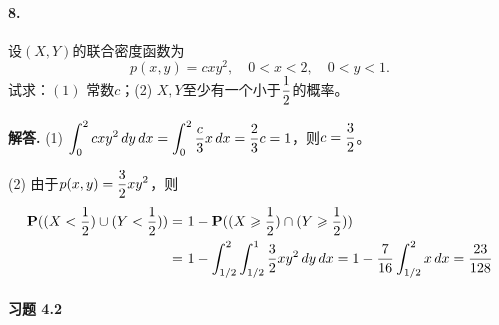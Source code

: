\documentclass[12pt, a4paper, oneside]{ctexart}
\newenvironment{solution}{\par\noindent\textbf{解答. }}{\bigskip\par}
\begin{document}
\paragraph{8.}设$(X,Y)$的联合密度函数为
\begin{equation*}
    p(x, y) = cxy^2,\quad 0 < x <  2,\quad 0 < y < 1.
\end{equation*}
试求：$(1)$ 常数$c$；(2) $X, Y$至少有一个小于$\displaystyle\frac{1}{2}$的概率。
\begin{solution}
    (1) $\displaystyle \int_0^2cxy^2\,dy\,dx = \int_0^2\frac{c}{3}x\,dx = \frac{2}{3}c = 1$，则$\displaystyle c = \frac{3}{2}$。

    (2) 由于$\displaystyle p(x, y) = \frac{3}{2}xy^2$，则
    \begin{equation*}
        \begin{aligned}
            \P((X < \frac{1}{2})\cup (Y < \frac{1}{2})) =&\ 1-\P((X\geqslant \frac{1}{2})\cap(Y\geqslant \frac{1}{2}))\\
             =&\ 1-\int_{1/2}^2\int_{1/2}^1\frac{3}{2}xy^2\,dy\,dx = 1-\frac{7}{16}\int_{1/2}^2x\,dx = \frac{23}{128}
        \end{aligned}
    \end{equation*}
\end{solution}
\paragraph{习题 4.2}
\end{document}
